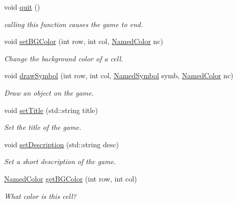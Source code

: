 \begin{DoxyCompactItemize}
\item 
void \hyperlink{classbridges_1_1game_1_1_game_base_a78d8bdc86cf7c5aba6a75879be1b6140}{quit} ()
\begin{DoxyCompactList}\small\item\em calling this function causes the game to end. \end{DoxyCompactList}\item 
void \hyperlink{classbridges_1_1game_1_1_game_base_ab667bbca1c81e5fb3aa8d81d70fe8cd2}{set\+B\+G\+Color} (int row, int col, \hyperlink{namespacebridges_1_1game_afaa832a4322b25b6a4ebfba832f10f26}{Named\+Color} nc)
\begin{DoxyCompactList}\small\item\em Change the background color of a cell. \end{DoxyCompactList}\item 
void \hyperlink{classbridges_1_1game_1_1_game_base_a415fa8f70bef364dfa966f2a86048901}{draw\+Symbol} (int row, int col, \hyperlink{namespacebridges_1_1game_ab9a19c7ab6e2ebac2f95180e21733487}{Named\+Symbol} symb, \hyperlink{namespacebridges_1_1game_afaa832a4322b25b6a4ebfba832f10f26}{Named\+Color} nc)
\begin{DoxyCompactList}\small\item\em Draw an object on the game. \end{DoxyCompactList}\item 
void \hyperlink{classbridges_1_1game_1_1_game_base_a108c2e3050a4d3f3af9950434e97102a}{set\+Title} (std\+::string title)
\begin{DoxyCompactList}\small\item\em Set the title of the game. \end{DoxyCompactList}\item 
void \hyperlink{classbridges_1_1game_1_1_game_base_ab490d78e11e4117c3a4915c78afa0973}{set\+Description} (std\+::string desc)
\begin{DoxyCompactList}\small\item\em Set a short description of the game. \end{DoxyCompactList}\item 
\hyperlink{namespacebridges_1_1game_afaa832a4322b25b6a4ebfba832f10f26}{Named\+Color} \hyperlink{classbridges_1_1game_1_1_game_base_a924f911774a89d18ccb391bb28fd703c}{get\+B\+G\+Color} (int row, int col)
\begin{DoxyCompactList}\small\item\em What color is this cell? \end{DoxyCompactList}\item 

\end{DoxyCompactItemize}
